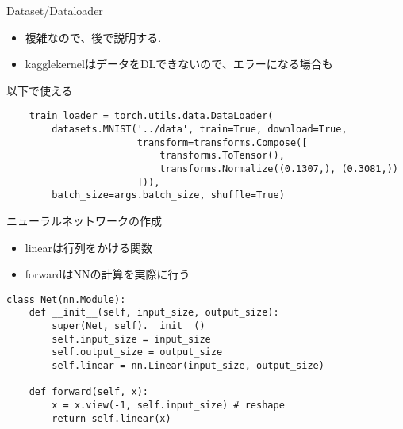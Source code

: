 \begin{frame}[fragile]{Dataset/Dataloader}
\begin{itemize}
\item 複雑なので、後で説明する.
\item kagglekernelはデータをDLできないので、エラーになる場合も
\end{itemize}
以下で使える
\begin{verbatim}
    train_loader = torch.utils.data.DataLoader(
        datasets.MNIST('../data', train=True, download=True,
                       transform=transforms.Compose([
                           transforms.ToTensor(),
                           transforms.Normalize((0.1307,), (0.3081,))
                       ])),
        batch_size=args.batch_size, shuffle=True)
\end{verbatim}
\end{frame}


\begin{frame}[fragile]{ニューラルネットワークの作成}
\begin{itemize}
\item linearは行列をかける関数
\item forwardはNNの計算を実際に行う
\end{itemize}

\begin{verbatim}
class Net(nn.Module):
    def __init__(self, input_size, output_size):
        super(Net, self).__init__()
        self.input_size = input_size
        self.output_size = output_size
        self.linear = nn.Linear(input_size, output_size)

    def forward(self, x):
        x = x.view(-1, self.input_size) # reshape
        return self.linear(x)
\end{verbatim}
\end{frame}

